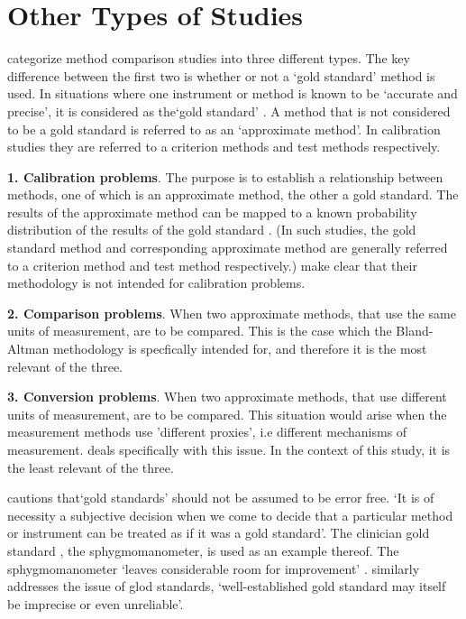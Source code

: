 \documentclass[Chap1bmain.tex]{subfiles}
\begin{document}
\section{Other Types of Studies}
\citet{lewis} categorize method comparison studies into three
different types.  The key difference between the first two is
whether or not a `gold standard' method is used. In situations
where one instrument or method is known to be `accurate and
precise', it is considered as the`gold standard' \citep{lewis}. A
method that is not considered to be a gold standard is referred to
as an `approximate method'. In calibration studies they are
referred to a criterion methods and test methods respectively.


\textbf{1. Calibration problems}. The purpose is to establish a
relationship between methods, one of which is an approximate
method, the other a gold standard. The results of the approximate
method can be mapped to a known probability distribution of the
results of the gold standard \citep{lewis}. (In such studies, the
gold standard method and corresponding approximate method are
generally referred to a criterion method and test method
respectively.) \citet*{BA83} make clear that their methodology is
not intended for calibration problems.

\bigskip \textbf{2. Comparison problems}. When two approximate
methods, that use the same units of measurement, are to be
compared. This is the case which the Bland-Altman methodology is
specfically intended for, and therefore it is the most relevant of
the three.

\bigskip \textbf{3. Conversion problems}. When two approximate
methods, that use different units of measurement, are to be
compared. This situation would arise when the measurement methods
use 'different proxies', i.e different mechanisms of measurement.
\citet{lewis} deals specifically with this issue. In the context
of this study, it is the least relevant of the three.

\citet[p.47]{DunnSEME} cautions that`gold standards' should not be
assumed to be error free. `It is of necessity a subjective
decision when we come to decide that a particular method or
instrument can be treated as if it was a gold standard'. The
clinician gold standard , the sphygmomanometer, is used as an
example thereof.  The sphygmomanometer `leaves considerable room
for improvement' \citep{DunnSEME}. \citet{pizzi} similarly
addresses the issue of glod standards, `well-established gold
standard may itself be imprecise or even unreliable'.
\end{document}
